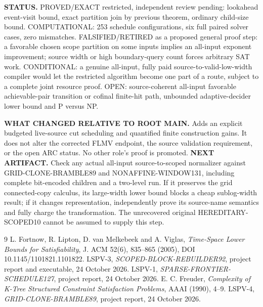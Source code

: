 \documentclass[11pt]{article}
\begin{document}
\textbf{STATUS.} PROVED/EXACT restricted, independent review pending: lookahead event-visit bound, exact partition join by previous theorem, ordinary child-size bound. COMPUTATIONAL: 253 schedule configurations, six full paired solver cases, zero mismatches. FALSIFIED/RETIRED as a proposed general proof step: a favorable chosen scope partition on some inputs implies an all-input exponent improvement; source width or high boundary-query count forces arbitrary SAT work. CONDITIONAL: a genuine all-input, fully paid source-to-valid-low-width compiler would let the restricted algorithm become one part of a route, subject to a complete joint resource proof. OPEN: source-coherent all-input favorable achievable-pair transition or cofinal finite-hit path, unbounded adaptive-decider lower bound and P versus NP.

\textbf{WHAT CHANGED RELATIVE TO ROOT MAIN.} Adds an explicit budgeted live-source cut scheduling and quantified finite construction gains. It does not alter the corrected FLMV endpoint, the source validation requirement, or the open ARC status. No other role's proof is promoted.
\textbf{NEXT ARTIFACT.} Check any actual all-input source-to-scoped normalizer against GRID-CLONE-BRAMBLE89 and NONAFFINE-WINDOW131, including complete bit-encoded children and a two-level run. If it preserves the grid connected-copy calculus, its large-width lower bound blocks a cheap sublog-width result; if it changes representation, independently prove its source-name semantics and fully charge the transformation. The unrecovered original HEREDITARY-SCOPED10 cannot be assumed to supply this step.

\begin{thebibliography}{9}
 L. Fortnow, R. Lipton, D. van Melkebeek and A. Viglas, \emph{Time-Space Lower Bounds for Satisfiability}, J. ACM 52(6), 835--865 (2005), DOI 10.1145/1101821.1101822.
 LSPV-3, \emph{SCOPED-BLOCK-REBUILDER92}, project report and executable, 24 October 2026.
 LSPV-1, \emph{SPARSE-FRONTIER-SCHEDULE127}, project report, 24 October 2026.
 E. C. Freuder, \emph{Complexity of K-Tree Structured Constraint Satisfaction Problems}, AAAI (1990), 4--9.
 LSPV-4, \emph{GRID-CLONE-BRAMBLE89}, project report, 24 October 2026.
\end{thebibliography}
\end{document}
